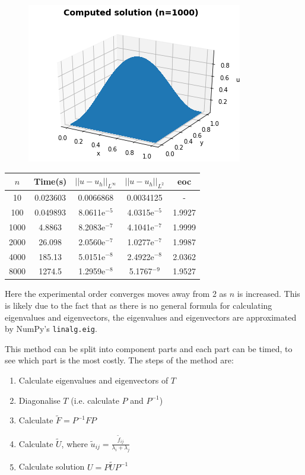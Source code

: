 \documentclass{article}
\numberwithin{equation}{section}
\begin{document}
\begin{figure}[H]
\includegraphics[scale=.7]{img/U_trans.png}
\centering
\end{figure}

\begin{table}[H]
\centering
\begin{tabular}{|c|c|c|c|c|}
\hline
$n$ & Time(s) & $|| u - u_h ||_{L^{\infty}}$ &$|| u - u_h ||_{L^{2}}$ & eoc \\
\hline
10 & 0.023603 & 0.0066868 & 0.0034125 & - \\
100 & 0.049893 & 8.0611e$^{-5}$ & 4.0315e$^{-5}$ & 1.9927  \\ 
1000 & 4.8863 & 8.2083e$^{-7}$ & 4.1041e$^{-7}$ & 1.9999  \\
2000 & 26.098 & 2.0560e$^{-7}$ & 1.0277e$^{-7}$ & 1.9987 \\
4000 & 185.13 & 5.0151e$^{-8}$ & 2.4922e$^{-8}$ & 2.0362 \\
8000 & 1274.5 & 1.2959e$^{-8}$ & 5.1767$^{-9}$ & 1.9527 \\
\hline
\end{tabular}
\end{table}

Here the experimental order converges moves away from 2 as $n$ is increased. This is likely due to the fact that as there is no general formula for calculating eigenvalues and eigenvectors, the eigenvalues and eigenvectors are approximated by NumPy's \texttt{linalg.eig}.

This method can be split into component parts and each part can be timed, to see which part is the most costly. The steps of the method are:
\begin{enumerate}
\item Calculate eigenvalues and eigenvectors of $T$
\item Diagonalise $T$ (i.e. calculate $P$ and $P^{-1}$)
\item Calculate $\tilde{F}=P^{-1}FP$
\item Calculate $\tilde{U}$, where $\tilde{u}_{ij} = \frac{\tilde{f}_{ij}}{\lambda_i + \lambda_j}$
\item Calculate solution $U=P \tilde{U}P^{-1}$
\end{enumerate}
\end{document}
